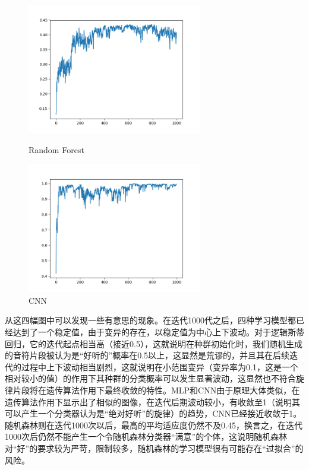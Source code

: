 \documentclass[UTF8,a4paper,10pt]{ctexart}
\begin{document}
    \begin{figure}[H]
    \begin{minipage}[t]{0.5\linewidth}
    \centering
    \includegraphics[width=3in]{output_forest.png}
    \caption{Random Forest}
    \label{fig:side:a}
    \end{minipage}%
    \begin{minipage}[t]{0.5\linewidth}
    \centering
    \includegraphics[width=3in]{output_cnn.png}
    \caption{CNN}
    \label{fig:side:b}
    \end{minipage}
    \end{figure}

    从这四幅图中可以发现一些有意思的现象。在迭代1000代之后，四种学习模型都已经达到了一个稳定值，由于变异的存在，以稳定值为中心上下波动。对于逻辑斯蒂回归，它的迭代起点相当高（接近0.5），这就说明在种群初始化时，我们随机生成的音符片段被认为是“好听的”概率在0.5以上，这显然是荒谬的，并且其在后续迭代的过程中上下波动相当剧烈，这就说明在小范围变异（变异率为0.1，这是一个相对较小的值）的作用下其种群的分类概率可以发生显著波动，这显然也不符合旋律片段将在遗传算法作用下最终收敛的特性。MLP和CNN由于原理大体类似，在遗传算法作用下显示出了相似的图像，在迭代后期波动较小，有收敛至1（说明其可以产生一个分类器认为是“绝对好听”的旋律）的趋势，CNN已经接近收敛于1。随机森林则在迭代1000次以后，最高的平均适应度仍然不及0.45，换言之，在迭代1000次后仍然不能产生一个令随机森林分类器“满意”的个体，这说明随机森林对“好”的要求较为严苛，限制较多，随机森林的学习模型很有可能存在“过拟合”的风险。
\end{document}
